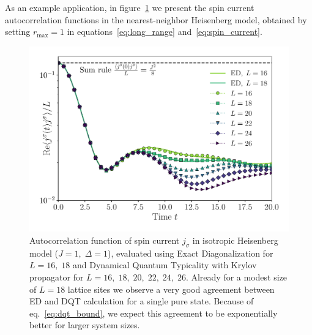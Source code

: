 As an example application, in figure~\ref{fig:spin_autocorr} we present the spin current autocorrelation functions
in the nearest-neighbor Heisenberg model, obtained by setting \(r_{\mathrm{max}}=1\) in equations~\eqref{eq:long_range} and~\eqref{eq:spin_current}. 
\begin{figure}[htbp]
	\centering
	\includegraphics[width=\textwidth]{Figures/autocorr_spin_current.pdf}
	\caption{Autocorrelation function of spin current \(j_{\sigma}\) in isotropic Heisenberg model
	(\(J=1,\;\Delta=1\)), evaluated
	using Exact Diagonalization for \(L=16,\;18\) and Dynamical Quantum Typicality with Krylov propagator
	for \(L=16,\;18,\;20,\;22,\;24,\;26\). Already for a modest size of \(L=18\) lattice sites we observe
	a very good agreement between ED and DQT calculation for a single pure state. Because of eq.~\eqref{eq:dqt_bound},
	we expect this agreement to be exponentially better for larger system sizes.}
	\label{fig:spin_autocorr}
\end{figure}

